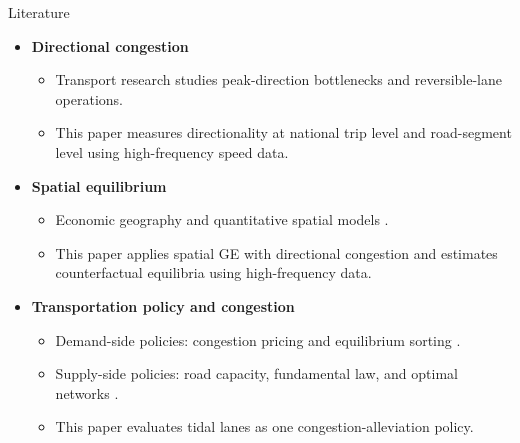 \documentclass[11pt,aspectratio=169]{beamer}
\begin{document}
\begin{frame}{Literature}
\begin{itemize}\small
  \item \textbf{Directional congestion}
  \begin{itemize}\footnotesize
    \item Transport research studies peak-direction bottlenecks and reversible-lane operations.
    \item This paper measures directionality at national trip level and road-segment level using high-frequency speed data.
  \end{itemize}
  \item \textbf{Spatial equilibrium}
  \begin{itemize}\footnotesize
    \item Economic geography and quantitative spatial models \citep{krugman1991,eaton2002,allen2014,ahlfeldt2015}.
    \item This paper applies spatial GE with directional congestion and estimates counterfactual equilibria using high-frequency data.
  \end{itemize}
  \item \textbf{Transportation policy and congestion}
  \begin{itemize}\footnotesize
    \item Demand-side policies: congestion pricing and equilibrium sorting \citep{vickrey1969,barwick2024,yang2020}.
    \item Supply-side policies: road capacity, fundamental law, and optimal networks \citep{duranton2011,fajgelbaum2020}.
    \item This paper evaluates tidal lanes as one congestion-alleviation policy.
  \end{itemize}
\end{itemize}
\end{frame}
\end{document}
